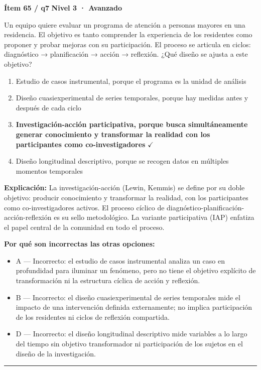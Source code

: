 \documentclass[12pt,a4paper]{article}
\begin{document}
\begin{mdframed}[backgroundcolor=fondogris,linecolor=rojo,linewidth=1pt,innerleftmargin=10pt,innerrightmargin=10pt,innertopmargin=7pt,innerbottommargin=7pt]
\textbf{Ítem 65 / q7} \hfill {\small\bfseries\color{rojo} Nivel 3 · Avanzado}
\end{mdframed}

Un equipo quiere evaluar un programa de atención a personas mayores en una residencia. El objetivo es tanto comprender la experiencia de los residentes como proponer y probar mejoras con su participación. El proceso se articula en ciclos: diagnóstico → planificación → acción → reflexión. ¿Qué diseño se ajusta a este objetivo?

\begin{enumerate}
  \item[A.] Estudio de casos instrumental, porque el programa es la unidad de análisis
  \item[B.] Diseño cuasiexperimental de series temporales, porque hay medidas antes y después de cada ciclo
  \item[\textbf{\color{verde}C.}] \textbf{\color{verde} Investigación-acción participativa, porque busca simultáneamente generar conocimiento y transformar la realidad con los participantes como co-investigadores} \hfill $\checkmark$
  \item[D.] Diseño longitudinal descriptivo, porque se recogen datos en múltiples momentos temporales
\end{enumerate}

\noindent\textbf{\color{azul}Explicación:} La investigación-acción (Lewin, Kemmis) se define por su doble objetivo: producir conocimiento y transformar la realidad, con los participantes como co-investigadores activos. El proceso cíclico de diagnóstico-planificación-acción-reflexión es su sello metodológico. La variante participativa (IAP) enfatiza el papel central de la comunidad en todo el proceso.

\noindent\textbf{\color{gris}Por qué son incorrectas las otras opciones:}
\begin{itemize}
  \item {\small A — Incorrecto: el estudio de casos instrumental analiza un caso en profundidad para iluminar un fenómeno, pero no tiene el objetivo explícito de transformación ni la estructura cíclica de acción y reflexión.}
  \item {\small B — Incorrecto: el diseño cuasiexperimental de series temporales mide el impacto de una intervención definida externamente; no implica participación de los residentes ni ciclos de reflexión compartida.}
  \item {\small D — Incorrecto: el diseño longitudinal descriptivo mide variables a lo largo del tiempo sin objetivo transformador ni participación de los sujetos en el diseño de la investigación.}
\end{itemize}
\vspace{8pt}\hrule\vspace{10pt}
\end{document}
